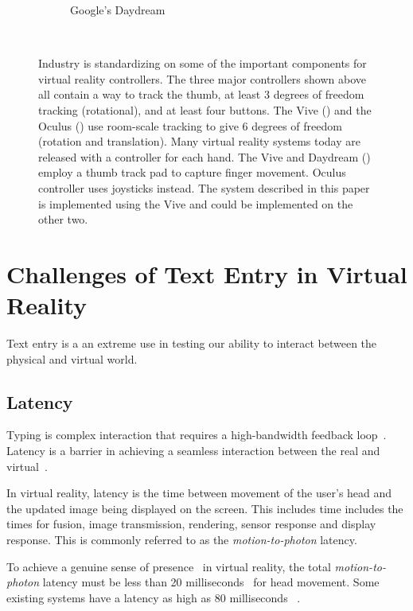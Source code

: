 \documentclass{sigchi}
\begin{document}
\begin{figure}
\begin{subfigure}{.4\columnwidth}
  \caption{Google's Daydream}\label{fig:controllerDaydream}
  \end{subfigure}
  \caption{
  Industry is standardizing on some of the important components for virtual reality controllers.
  The three major controllers shown above all contain a way to track the thumb, at least 3 degrees of freedom tracking  (rotational), and at least four buttons.
  The Vive () and the Oculus () use room-scale tracking to give 6 degrees of freedom (rotation and translation).  
  Many virtual reality systems today are released with a controller for each hand.  
  The Vive and Daydream () employ a thumb track pad to capture finger movement.
  Oculus controller uses joysticks instead.
  The system described in this paper is implemented using the Vive and could be implemented on the other two.
  }~\label{fig:controllers}

\end{figure}



\section{Challenges of Text Entry in Virtual Reality}
Text entry is a  an extreme use in testing our ability to interact between the physical and virtual world.

\subsection{Latency}
Typing is complex interaction that requires a high-bandwidth feedback loop~\cite{McGill:2015:DRO:2702123.2702382}.
Latency is a barrier in achieving a seamless interaction between the real and virtual~\cite{leedesigning}.

In virtual reality, latency is the time between movement of the user's head and the updated image being displayed on the screen.  
This includes time includes the times for fusion, image transmission,
rendering, sensor response and display response.
This is commonly referred to as the \textit{motion-to-photon} latency.

To achieve a genuine sense of presence~\cite{schuemie2001research} in virtual reality, the total \textit{motion-to-photon} latency must be less than 20 milliseconds~\cite{jerald2009relating,jerald2010scene,bailey2004latency} for head movement.
Some existing systems have a latency as high as 80 milliseconds ~\cite{lincoln2016motion,dallaire2016animated}.
\end{document}
